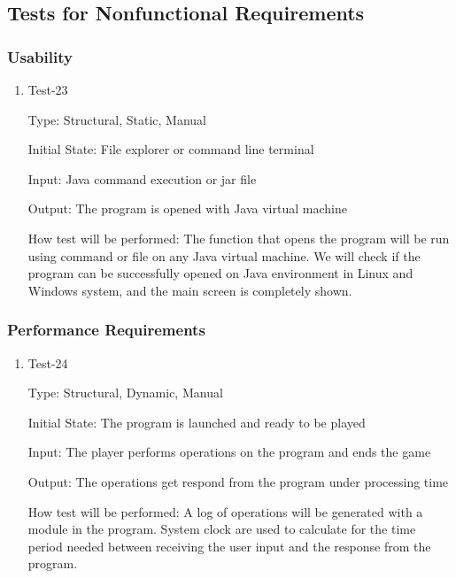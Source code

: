 \documentclass[12pt, titlepage]{article}
\begin{document}
\subsection{Tests for Nonfunctional Requirements}

\subsubsection{Usability}

\begin{enumerate}

\item{Test-23\\}

Type: Structural, Static, Manual

Initial State: File explorer or command line terminal

Input: Java command execution or jar file

Output: The program is opened with Java virtual machine

How test will be performed: The function that opens the program will be run using command or file on any Java virtual machine. We will check if the program can be successfully opened on Java environment in Linux and Windows system, and the main screen is completely shown.

\end{enumerate}

\subsubsection{Performance Requirements}

\begin{enumerate}

\item{Test-24\\}

Type: Structural, Dynamic, Manual

Initial State: The program is launched and ready to be played

Input: The player performs operations on the program and ends the game

Output: The operations get respond from the program under processing time

How test will be performed: A log of operations will be generated with a module in the program. System clock are used to calculate for the time period needed between receiving the user input and the response from the program.
\end{enumerate}
\end{document}
